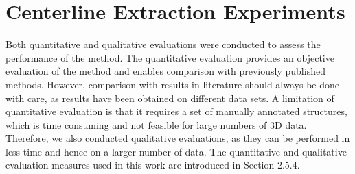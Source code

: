 
\section{Centerline Extraction Experiments}

Both quantitative and qualitative evaluations were conducted to assess the performance of the method. The quantitative evaluation provides an objective evaluation of the method and enables comparison with previously published methods. However, comparison with results in literature should always be done with care, as results have been obtained on different data sets. A limitation of quantitative evaluation is that it requires a set of manually annotated structures, which is time consuming and not feasible for large numbers of 3D data. Therefore, we also conducted qualitative evaluations, as they can be performed in less time and hence on a larger number of data. The quantitative and qualitative evaluation measures used in this work are introduced in Section 2.5.4.

